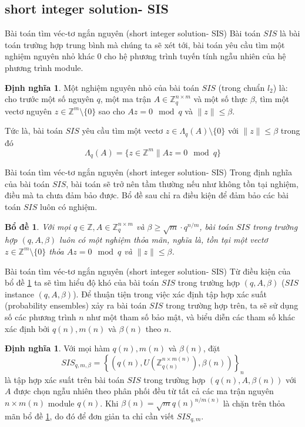 \documentclass[notheorems,envcountsect,serif,12pt]{beamer}
\providecommand{\norm}[1]{\lVert#1\rVert}
\newcommand{\Z}{\mathbb{Z}}
\numberwithin{equation}{section}
\newtheorem{lemma}[theorem]{Bổ đề}
\theoremstyle{definition}
\newtheorem{definition}[theorem]{Định nghĩa}
\numberwithin{equation}{section}
\begin{document}
\subsection[Bài toán tìm véc-tơ ngắn nguyên]{short integer solution- SIS}
\begin{frame}{Bài toán tìm véc-tơ ngắn nguyên (short integer solution- SIS)}
	Bài toán $SIS$ là bài toán trường hợp trung bình mà chúng ta sẽ xét tới, bài toán yêu cầu tìm một nghiệm nguyên nhỏ khác $0$ cho hệ phương trình tuyến tính ngẫu nhiên của hệ phương trình module.
	\begin{definition}
		Một nghiệm nguyên nhỏ của bài toán $SIS$ (trong chuẩn $l_2$) là: cho trước một số nguyên $q$, một ma trận $A\in \Z_q^{n\times m}$ và một số thực $\beta$, tìm một vectơ nguyên $z\in \Z^m\setminus\{0\}$ sao cho $Az=0 \mod q$ và $\norm{z}\le \beta$.
		
		Tức là, bài toán $SIS$ yêu cầu tìm một vectơ $z\in \Lambda_q(A)\setminus\{0\}$ với $\norm{z}\le \beta$ trong đó $$\Lambda_q(A)=\{z\in \Z^m \| Az=0 \mod q\}$$
	\end{definition}
\end{frame}
\begin{frame}{Bài toán tìm véc-tơ ngắn nguyên (short integer solution- SIS)}
	Trong định nghĩa của bài toán $SIS$, bài toán sẽ trở nên tầm thường nếu như không tồn tại nghiệm, điều mà ta chưa đảm bảo được. Bổ đề sau chỉ ra điều kiện để đảm bảo các bài toán $SIS$ luôn có nghiệm.\pause
	\begin{lemma}\label{BTTB_BD1}
		Với mọi $q\in \Z, A\in \Z_q^{n\times m}$ và $\beta \ge \sqrt{m}\cdot q^{n/m}$, bài toán $SIS$ trong trường hợp $(q, A, \beta)$ luôn có một nghiệm thỏa mãn, nghĩa là, tồn tại một vectơ $z\in \Z^m\setminus\{0\}$ thỏa $Az=0\mod q$ và $\norm{z}\le \beta$.
	\end{lemma}
\end{frame}
\begin{frame}{Bài toán tìm véc-tơ ngắn nguyên (short integer solution- SIS)}
Từ điều kiện của bổ đề \ref{BTTB_BD1} ta sẽ tìm hiểu độ khó của bài toán $SIS$ trong trường hợp $(q, A, \beta)$ ($SIS$ instance $(q, A, \beta)$). Để thuận tiện trong việc xác định tập hợp xác suất (probability ensembles) xảy ra bài toán $SIS$ trong trường hợp trên, ta sẽ sử dụng số các phương trình $n$ như một tham số bảo mật, và biểu diễn các tham số khác xác định bởi $q(n), m(n)$ và $\beta(n)$ theo $n$.\pause
\begin{definition}
		Với mọi hàm $q(n), m(n)$ và $\beta(n)$, đặt $$SIS_{q, m, \beta}=\left\{\left(q(n), U\left(\Z_{q(n)}^{n\times m(n)}\right), \beta(n)\right)\right\}_n$$ là tập hợp xác suất trên bài toán $SIS$ trong trường hợp $\left(q(n), A, \beta(n)\right)$ với $A$ được chọn ngẫu nhiên theo phân phối đều từ tất cả các ma trận nguyên $n\times m(n)$ module $q(n)$. Khi $\beta(n)=\sqrt{m}q(n)^{n/m(n)}$ là chặn trên thỏa mãn bổ đề \ref{BTTB_BD1}, do đó để đơn giản ta chỉ cần viết $SIS_{q, m}$.
\end{definition}
\end{frame}
\end{document}
